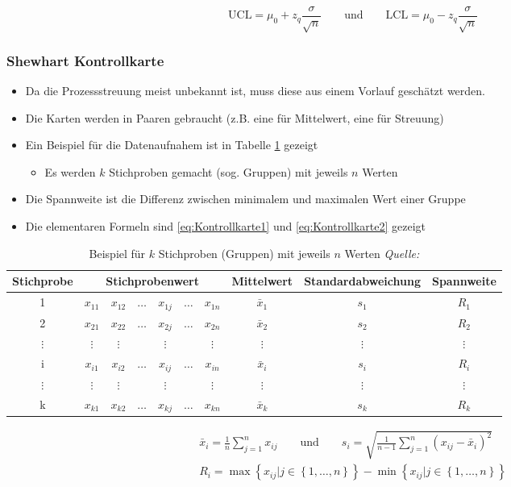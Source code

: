 \begin{equation}
	\label{eq:UCLLCL1}
	\text{UCL} = \mu_0 + z_q\frac{\sigma}{\sqrt{n}} \qquad \text{und} \qquad
	\text{LCL} = \mu_0 - z_q\frac{\sigma}{\sqrt{n}}
\end{equation}

\subsubsection{Shewhart Kontrollkarte}
\begin{itemize}
	\item Da die Prozessstreuung meist unbekannt ist, muss diese aus einem Vorlauf geschätzt werden. 
	\item Die Karten werden in Paaren gebraucht (z.B. eine für Mittelwert, eine für Streuung)
	\item Ein Beispiel für die Datenaufnahem ist in Tabelle \ref{tab:RSKarte} gezeigt
	\begin{itemize}
		\item Es werden $k$ Stichproben gemacht (sog. Gruppen) mit jeweils $n$ Werten
	\end{itemize}
	\item Die Spannweite ist die Differenz zwischen minimalem und maximalen Wert einer Gruppe
	\item Die elementaren Formeln sind \ref{eq:Kontrollkarte1} und \ref{eq:Kontrollkarte2} gezeigt
\end{itemize}
\begin{table}[!h]
	\centering
	\begin{tabular}{c |c c c c cc|c|c|c}
		Stichprobe	& \multicolumn{6}{c|}{Stichprobenwert} & Mittelwert 	& Standardabweichung &Spannweite\\\hline
		1			&$x_{11}$&$x_{12}$&$\ldots$&$x_{1j}$&$\ldots$&$x_{1n}$&$\bar{x}_1$	&$s_1$	&$R_1$\\
		2			&$x_{21}$&$x_{22}$&$\ldots$&$x_{2j}$&$\ldots$&$x_{2n}$&$\bar{x}_2$	&$s_2$	&$R_2$\\
		$\vdots$	&$\vdots$&$\vdots$& 	   &$\vdots$&		 &$\vdots$&$\vdots$		&$\vdots$&$\vdots$\\
		i			&$x_{i1}$&$x_{i2}$&$\ldots$&$x_{ij}$&$\ldots$&$x_{in}$&$\bar{x}_i$	&$s_i$	&$R_i$\\
		$\vdots$	&$\vdots$&$\vdots$& 	   &$\vdots$&		 &$\vdots$&$\vdots$		&$\vdots$&$\vdots$\\
		k			&$x_{k1}$&$x_{k2}$&$\ldots$&$x_{kj}$&$\ldots$&$x_{kn}$&$\bar{x}_k$	&$s_k$	&$R_k$\\
	\end{tabular}
	\caption{Beispiel für $k$ Stichproben (Gruppen) mit jeweils $n$ Werten \textit{Quelle:}\cite{C:RSKarte}}
	\label{tab:RSKarte}
\end{table}
\begin{align}
	\label{eq:Kontrollkarte1}
	\bar{x}_i = \frac{1}{n}\sum_{j=1}^{n}x_{ij} \qquad \text{und} \qquad s_i=\sqrt{\frac{1}{n-1}\sum_{j=1}^{n}\left(x_{ij}-\bar{x}_i\right)^2}\\
	\label{eq:Kontrollkarte2}
	R_i = \max\left\lbrace x_{ij}\vert j\in \left\lbrace 1,\ldots,n\right\rbrace\right\rbrace - \min\left\lbrace x_{ij}\vert j\in \left\lbrace 1,\ldots,n\right\rbrace\right\rbrace
\end{align}

